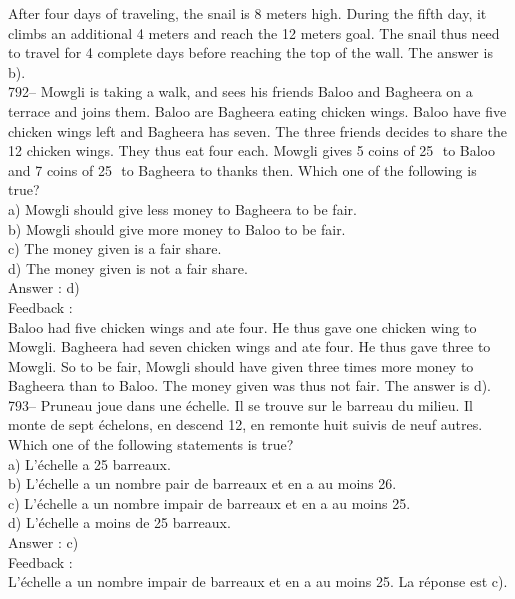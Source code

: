 \documentclass[letterpaper, 12pt]{article}
\begin{document}
After four days of traveling, the snail is 8 meters high. During the fifth day, it climbs an additional 4 meters and reach the 12 meters goal. The snail thus need to travel for 4 complete days before reaching the top of the wall. The answer is b).\\

792-- Mowgli is taking a walk, and sees his friends Baloo and Bagheera on a terrace and joins them. Baloo are Bagheera eating chicken wings. Baloo have five chicken wings left and Bagheera has seven. The three friends decides to share the 12 chicken wings. They thus eat four each. Mowgli gives 5 coins of 25\,\cent \ to Baloo and 7 coins of 25\,\cent \ to Bagheera to thanks then. Which one of the following is true?\\
a) Mowgli should give less money to Bagheera to be fair.\\
b) Mowgli should give more money to Baloo to be fair.\\
c) The money given is a fair share.\\
d) The money given is not a fair share.\\

Answer : d)\\

Feedback : \\
Baloo had five chicken wings and ate four. He thus gave one chicken wing to Mowgli.  Bagheera had seven chicken wings and ate four. He thus gave three to Mowgli. So to be fair, Mowgli should have given three times more money to Bagheera than to Baloo. The money given was thus not fair. The answer is d).\\


793-- Pruneau joue dans une \'echelle.  Il se trouve sur le barreau du
milieu.  Il monte de sept \'echelons, en descend 12, en remonte huit suivis
de neuf autres.  Which one of the following statements is true?\\
a) L'\'echelle a 25 barreaux.\\
b) L'\'echelle a un nombre pair de barreaux et en a au moins 26.\\
c) L'\'echelle a un nombre impair de barreaux et en a au moins 25.\\
d) L'\'echelle a moins de 25 barreaux.\\

Answer : c)\\

Feedback : \\
L'\'echelle a un nombre impair de barreaux et en a au moins 25.  La
r\'eponse est c).\\
\end{document}
